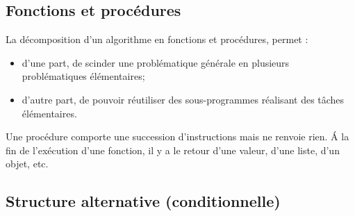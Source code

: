 \documentclass[10pt,fleqn]{article} %
\begin{document}
\subsection{Fonctions et procédures}
La décomposition d’un algorithme en fonctions et procédures, permet :
\begin{itemize}
\item d’une part, de scinder une problématique générale en plusieurs problématiques
élémentaires;
\item d’autre part, de pouvoir réutiliser des sous-programmes réalisant des tâches élémentaires.
\end{itemize}

%
%
%

Une procédure comporte une succession d’instructions mais ne renvoie rien.
\'A la fin de l’exécution d’une fonction, il y a le retour d’une valeur, d’une liste, d’un objet, etc.
\subsection{Structure alternative (conditionnelle)}
\end{document}
